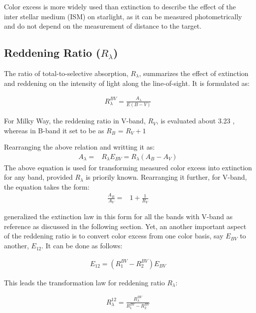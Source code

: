 Color excess is more widely used than extinction to describe the effect of the inter stellar medium (ISM) on starlight, as it can be measured photometrically and do not depend on the measurement of distance to the target. 

\subsection{Reddening Ratio ($R_{\lambda}$)}
The ratio of total-to-selective absorption, $R_\lambda$, summarizes the effect of extinction and reddening on the intensity of light along the line-of-sight. It is formulated as:

\begin{align}\label{eq:reddening_ratio}
R_\lambda^{BV} = \frac{A_\lambda}{E(B-V)}
\end{align}

For Milky Way, the reddening ratio in V-band, $R_V$, is evaluated about 3.23 \citep{2004sandage}, whereas in B-band it set to be as $R_B$ = $R_V + 1$

Rearranging the above relation and writting it as:
\begin{align}\label{eq:extinction}
	A_\lambda =& R_\lambda E_{BV} = R_\lambda (A_B - A_V) 
\end{align}
The above equation is used for transforming measured color excess into extinction for any band, provided $R_\lambda$ is priorily known.  Rearranging it further, for V-band, the equation takes the form:
\begin{align}
	\frac{A_B}{A_V} = & 1 + \frac{1}{R_V}
\end{align}

\cite{1989cardelli} generalized the extinction law in this form for all the bands with V-band as reference as discussed in the following section. Yet, an another important aspect of the reddening ratio is to convert color excess from one color basis, say $E_{BV}$ to another, $E_{1 2}$. It can be done as follows:

\begin{align*}
E_{12} = (R_{1}^{BV} - R_{2}^{BV}) E_{BV} 
\end{align*}


This leads the transformation law for reddening ratio $R_\lambda$:

\begin{align}\label{R_transform}
    R_\lambda^{12} = \frac{R_\lambda^{BV}}{R_1^{BV} - R_2^{BV}}
\end{align}

